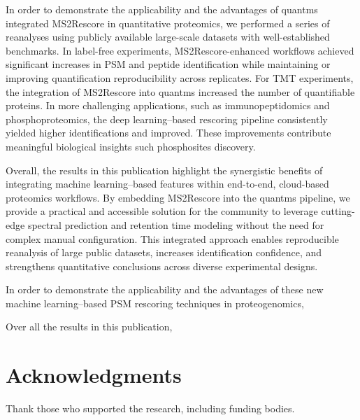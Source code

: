 \documentclass[12pt]{article}
\begin{document}
In order to demonstrate the applicability and the advantages of quantms integrated MS2Rescore in quantitative proteomics, we performed a series of reanalyses using publicly available large-scale datasets with well-established benchmarks. In label-free experiments, MS2Rescore-enhanced workflows achieved significant increases in PSM and peptide identification while maintaining or improving quantification reproducibility across replicates. For TMT experiments, the integration of MS2Rescore into quantms increased the number of quantifiable proteins. In more challenging applications, such as immunopeptidomics and phosphoproteomics, the deep learning–based rescoring pipeline consistently yielded higher identifications and improved. These improvements contribute meaningful biological insights such phosphosites discovery.

Overall, the results in this publication highlight the synergistic benefits of integrating machine learning–based features within end-to-end, cloud-based proteomics workflows. By embedding MS2Rescore into the quantms pipeline, we provide a practical and accessible solution for the community to leverage cutting-edge spectral prediction and retention time modeling without the need for complex manual configuration. This integrated approach enables reproducible reanalysis of large public datasets, increases identification confidence, and strengthens quantitative conclusions across diverse experimental designs.



In order to demonstrate the applicability and the advantages of these new machine learning–based PSM rescoring techniques in proteogenomics,


Over all the results in this publication,


\section*{Acknowledgments}
Thank those who supported the research, including funding bodies.




\renewcommand\thefigure{S\arabic{figure}}
\setcounter{figure}{0}
\end{document}
